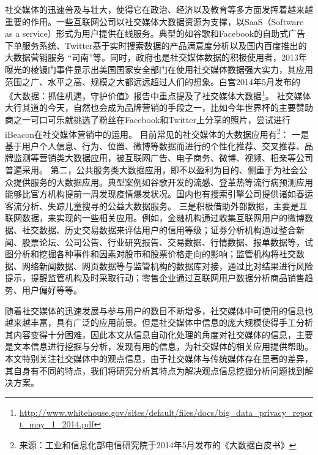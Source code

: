 社交媒体的迅速普及与壮大，使得它在政治、经济以及教育等多方面发挥着越来越重要的作用。一些互联网公司以社交媒体大数据资源为支撑，以SaaS（Software as a service）形式为用户提供在线服务。典型的如谷歌和Facebook的自助式广告下单服务系统、Twitter基于实时搜索数据的产品满意度分析以及国内百度推出的大数据营销服务 “司南”等。同时，政府也是社交媒体数据的积极使用者，2013年曝光的棱镜门事件显示出美国国家安全部门在使用社交媒体数据强大实力，其应用范围之广、水平之高、规模之大都远远超过人们的想象。白宫2014年5月发布的《大数据：抓住机遇，守护价值》报告中重点提及了社交媒体大数据\footnote{\url{http://www.whitehouse.gov/sites/default/files/docs/big\_data\_privacy\_report\_may\_1\_2014.pdf}}。
社交媒体大行其道的今天，自然也会成为品牌营销的手段之一，比如今年世界杯的主要赞助商之一可口可乐就挑选了粉丝在Facebook和Twitter上分享的照片，尝试进行iBeacon在社交媒体营销中的运用。
目前常见的社交媒体的大数据应用有\footnote{来源：工业和信息化部电信研究院于2014年5月发布的《大数据白皮书》}：
一是基于用户个人信息、行为、位置、微博等数据而进行的个性化推荐、交叉推荐、品牌监测等营销类大数据应用，被互联网广告、电子商务、微博、视频、相亲等公司普遍采用。
第二，公共服务类大数据应用，即不以盈利为目的、侧重于为社会公众提供服务的大数据应用。典型案例如谷歌开发的流感、登革热等流行病预测应用能够比官方机构提前一周发现疫情爆发状况。国内也有搜索引擎公司提供诸如春运客流分析、失踪儿童搜寻的公益大数据服务。
三是积极借助外部数据，主要是互联网数据，来实现的一些相关应用。例如，金融机构通过收集互联网用户的微博数据、社交数据、历史交易数据来评估用户的信用等级；证券分析机构通过整合新闻、股票论坛、公司公告、行业研究报告、交易数据、行情数据、报单数据等，试图分析和挖掘各种事件和因素对股市和股票价格走向的影响；监管机构将社交数据、网络新闻数据、网页数据等与监管机构的数据库对接，通过比对结果进行风险提示，提醒监管机构及时采取行动；零售企业通过互联网用户数据分析商品销售趋势、用户偏好等等。

随着社交媒体的迅速发展与参与用户的数目不断增多，社交媒体中可使用的信息也越来越丰富，具有广泛的应用前景。但是社交媒体中信息的庞大规模使得手工分析其内容变得十分困难，因此本文从信息自动化处理的角度对社交媒体的信息，主要是文本信息进行挖掘与分析，发现有用的信息，为社交媒体的相关应用提供帮助。本文特别关注社交媒体中的观点信息，由于社交媒体与传统媒体存在显著的差异，其自身有不同的特点，我们将研究分析其特点为解决观点信息挖掘分析问题找到解决方案。


